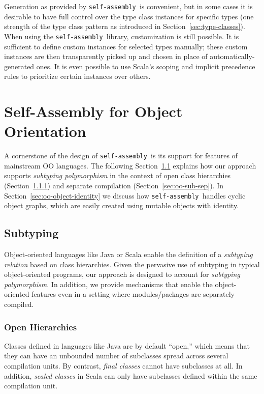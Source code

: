 \documentclass[preprint,nocopyrightspace]{sigplanconf}
\newcommand{\selfassembly}{\texttt{self-assembly~}}
\begin{document}
Generation as provided by \selfassembly is convenient, but in some cases it is desirable
to have full control over the type class instances for specific types (one strength of the
type class pattern as introduced in Section~\ref{sec:type-classes}). When using the
\selfassembly library, customization is still possible. It is sufficient to define
custom instances for selected types manually; these custom instances are then transparently
picked up and chosen in place of automatically-generated ones. It is even possible to
use Scala's scoping and implicit precedence rules to prioritize certain instances over
others.

\section{Self-Assembly for Object Orientation}\label{sec:oo}

A cornerstone of the design of \selfassembly is its support for features of mainstream
OO languages. The following Section~\ref{sec:oo-sub} explains how our approach supports
{\em subtyping polymorphism} in the context of open class hierarchies (Section~\ref{sec:oo-sub-open})
and separate compilation (Section~\ref{sec:oo-sub-sep}). In Section~\ref{sec:oo-object-identity}
we discuss how \selfassembly handles cyclic object graphs, which are easily created
using mutable objects with identity.


\subsection{Subtyping}\label{sec:oo-sub}

Object-oriented languages like Java or Scala enable the definition of a
\emph{subtyping relation} based on class hierarchies. Given the pervasive use
of subtyping in typical object-oriented programs, our approach is designed to
account for \emph{subtyping polymorphism}. In addition, we provide mechanisms
that enable the object-oriented features even in a setting where
modules/packages are separately compiled.

\subsubsection{Open Hierarchies}\label{sec:oo-sub-open}

Classes defined in languages like Java are by default ``open,'' which means
that they can have an unbounded number of subclasses spread across several
compilation units. By contrast, \emph{final classes} cannot have subclasses at
all. In addition, \emph{sealed classes} in Scala can only have subclasses
defined within the same compilation unit.
\end{document}
